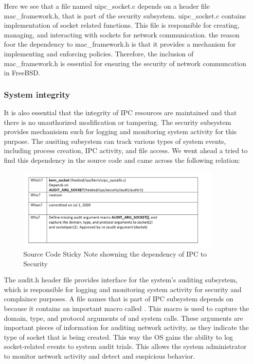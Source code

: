 \documentclass[12pt, dvipsnames, a4paper]{article}
\begin{document}
Here we see that a file named uipc_socket.c depends on a header file mac_framework.h, that is part of the security subsystem. uipc_socket.c contains implementation of socket related functions. This file is responsible for creating, managing, and interacting with sockets for network communication. the reason foor the dependency to mac_framework.h is that it provides a mechanism for implementing and enforcing  policies. Therefore, the inclusion of mac_framework.h is essential for ensuring the security of network communcation in FreeBSD.

\subsubsection{System integrity}
It is also essential that the integrity of IPC resources are maintained and that there is no unauthorized modification or tampering. The security subsystem provides mechanisism such for logging and monitoring system activity for this purpose. The ausiting subsystem can track various types of system events, including process creation, IPC activity, and file access. We went ahead a tried to find this dependency in the source code and came across the following relation:

\begin{figure}[hbt!]
	\centering
	\includegraphics[width=290pt]{assets/4W's_1.png}
	\caption{Source Code Sticky Note showning the dependency of IPC to Security} 
\end{figure}

The audit.h header file provides interface for the system's auditing subsystem, which is responsible for logging and monitoring system activity for security and complaince purposes. A file names  that is part of IPC subsystem depends on  because it contains an important macro called . This macro is used to capture the domain, type, and protocol arguments of  and  system calls. These arguments are important pieces of information for auditing network activity, as they indicate the type of socket that is being created. This way the OS gains the ability to log socket-related events to system audit trials. This allows the system administrator to monitor network activity and detect and suspicious behavior.
\end{document}
